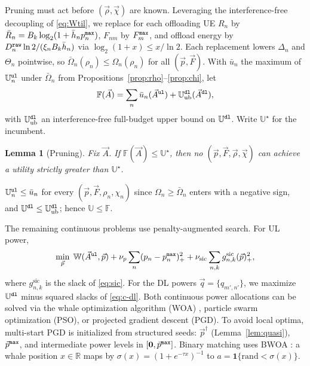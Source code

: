 \documentclass[journal]{IEEEtran}
\newtheorem{lemma}{Lemma}
\begin{document}
{\color{blue}Pruning must act before $(\vec{\rho},\vec{\chi})$ are known. Leveraging the interference-free decoupling of \eqref{eq:Wtil}, we replace for each offloading UE $R_n$ by $\bar R_n=B_k\log_2(1+\bar h_np_n^{\tt max})$, $F_{nm}$ by $F_m^{\tt max}$, and offload energy by $D_n^{\tt raw}\ln2/(\xi_nB_k\bar h_n)$ via $\log_2(1+x)\le x/\ln2$. Each replacement lowers $\Delta_n$ and $\Theta_n$ pointwise, so $\bar\Omega_n(\rho_n)\le\Omega_n(\rho_n)$ for all $(\vec{p},\vec{F})$. With $\bar u_n$ the maximum of $\mathbb{U}_n^{\tt ul}$ under $\bar\Omega_n$ from Propositions~\ref{prop:rho}--\ref{prop:chi}, let}
\begin{equation}
\mathbb{F}(\vec{A})=\sum_{n}\bar u_n(\vec{A}^{\tt ul})+\mathbb{U}^{\tt dl}_{\mathrm{ub}}(\vec{A}^{\tt dl}),
\label{eq:Fbound}
\end{equation}
{\color{blue}with $\mathbb{U}^{\tt dl}_{\mathrm{ub}}$ an interference-free full-budget upper bound on $\mathbb{U}^{\tt dl}$. Write $\mathbb{U}^\star$ for the incumbent.}

\begin{lemma}[Pruning]\label{lem:prune}
{\color{blue}Fix $\vec{A}$. If $\mathbb{F}(\vec{A})\le\mathbb{U}^\star$, then no $(\vec{p},\vec{F},\vec{\rho},\vec{\chi})$ can achieve a utility strictly greater than $\mathbb{U}^\star$.}
\end{lemma}
\begin{IEEEproof}
$\mathbb{U}_n^{\tt ul}\le\bar u_n$ for every $(\vec{p},\vec{F},\rho_n,\chi_n)$ since $\Omega_n\ge\bar\Omega_n$ enters with a negative sign, and $\mathbb{U}^{\tt dl}\le\mathbb{U}^{\tt dl}_{\mathrm{ub}}$; hence $\mathbb{U}\le\mathbb{F}$.
\end{IEEEproof}

The remaining continuous problems use penalty-augmented search. For UL power,
\begin{equation}
\min_{\vec{p}}\;
\mathbb{W}(\vec{A}^{\tt ul},\vec{p})
+\nu_p\sum_n(p_n-p_n^{\tt max})_+^2
+\nu_{\mathrm{sic}}\sum_{n,k}g_{n,k}^{\mathrm{sic}}(\vec{p})_+^2,
\label{eq:mpc}
\end{equation}
where $g_{n,k}^{\mathrm{sic}}$ is the slack of \eqref{eq:sic}. For the DL powers $\vec{q}=\{q_{m',n'}\}$, we maximize $\mathbb{U}^{\tt dl}$ minus squared slacks of \eqref{eq:c-dl}. 
{\color{blue}Both continuous power allocations can be solved via the whale optimization algorithm (WOA) \cite{mirjalili2016whale}, particle swarm optimization (PSO), or projected gradient descent (PGD). To avoid local optima, multi-start PGD is initialized from structured seeds: $\vec{p}^\dagger$ (Lemma~\ref{lem:quasi}), $\vec{p}^{\tt max}$, and intermediate power levels in $[\mathbf{0}, \vec{p}^{\tt max}]$.} 
Binary matching uses BWOA \cite{kumar2020binary}: a whale position $x\in\mathbb{R}$ maps by $\sigma(x)=(1+e^{-\tau x})^{-1}$ to $a=\mathbf{1}\{\mathrm{rand}<\sigma(x)\}$.
\end{document}
